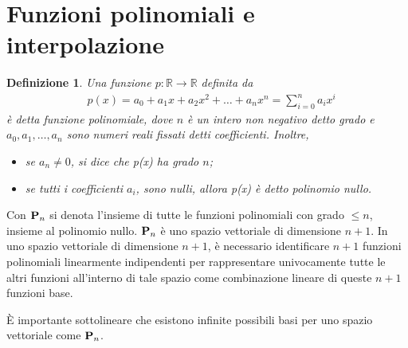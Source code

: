 \documentclass{article}
\newtheorem*{definition}{\color{red}\textbf{Definizione}}
\numberwithin{equation}{section}
\begin{document}
\section{Funzioni polinomiali e interpolazione}
\begin{definition}
    Una funzione $p:\mathbb{R}\rightarrow \mathbb{R}$ definita da 
    \begin{equation} \label{eq:teorema_fondamentale_algebra}
       \begin{aligned}
           &
           p(x)=a_0+a_1x+a_2x^2+\ldots+a_nx^n=\displaystyle\sum_{i=0}^{n}a_ix^i
       \end{aligned} 
    \end{equation}
    è detta funzione polinomiale, dove $n$ è un intero non negativo detto 
    grado e $a_0,a_1,\ldots,a_n$ sono numeri reali fissati detti
    {coefficienti}. Inoltre,
    \begin{itemize}
        \item se $a_n\neq 0$, si dice che p(x) ha grado $n$; 
        \item se tutti i coefficienti $a_i$, sono nulli, 
            allora p(x) è detto polinomio nullo.
    \end{itemize}
\end{definition}
Con $\text{\textbf{P}}_n$ si denota l'insieme di tutte le funzioni polinomiali
con grado $\leq n$, insieme al polinomio nullo. $\text{\textbf{P}}_n$ è uno
spazio vettoriale di dimensione $n+1$. In uno spazio vettoriale di dimensione
$n+1$, è necessario identificare $n+1$ funzioni polinomiali linearmente
indipendenti per rappresentare univocamente tutte le altri funzioni all'interno 
di tale spazio come combinazione lineare di queste $n+1$ funzioni base.

È importante sottolineare che esistono infinite possibili basi per uno spazio
vettoriale come $\text{\textbf{P}}_n$.
\end{document}
